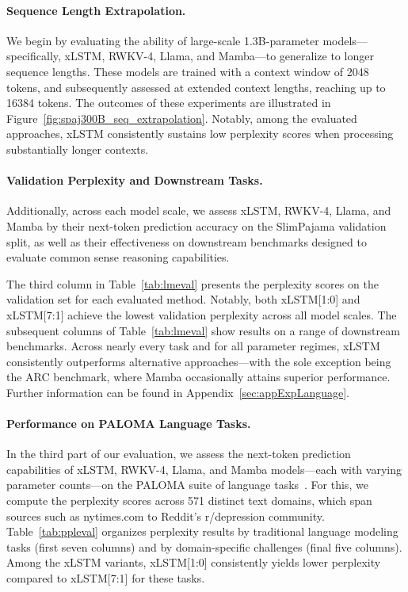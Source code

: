 \paragraph{Sequence Length Extrapolation.}
\label{sec:spaj300B_ctx_extrapolation}
We begin by evaluating the ability of large-scale 1.3B-parameter models—specifically, xLSTM, RWKV-4, Llama, and Mamba—to generalize to longer sequence lengths. These models are trained with a context window of 2048 tokens, and subsequently assessed at extended context lengths, reaching up to 16384 tokens. The outcomes of these experiments are illustrated in Figure~\ref{fig:spaj300B_seq_extrapolation}. Notably, among the evaluated approaches, xLSTM consistently sustains low perplexity scores when processing substantially longer contexts.

\paragraph{Validation Perplexity and Downstream Tasks.}
\label{sec:spaj_downstream_eval}
Additionally, across each model scale, we assess xLSTM, RWKV-4, Llama, and Mamba by their next-token prediction accuracy on the SlimPajama validation split, as well as their effectiveness on downstream benchmarks designed to evaluate common sense reasoning capabilities.

The third column in Table~\ref{tab:lmeval} presents the perplexity scores on the validation set for each evaluated method. Notably, both xLSTM[1:0] and xLSTM[7:1] achieve the lowest validation perplexity across all model scales. The subsequent columns of Table~\ref{tab:lmeval} show results on a range of downstream benchmarks. Across nearly every task and for all parameter regimes, xLSTM consistently outperforms alternative approaches—with the sole exception being the ARC benchmark, where Mamba occasionally attains superior performance. Further information can be found in Appendix~\ref{sec:appExpLanguage}.

\paragraph{Performance on PALOMA Language Tasks.} In the third part of our evaluation, we assess the next-token prediction capabilities of xLSTM, RWKV-4, Llama, and Mamba models—each with varying parameter counts—on the PALOMA suite of language tasks~\citep{Magnusson:23arxivshort}. For this, we compute the perplexity scores across 571 distinct text domains, which span sources such as nytimes.com to Reddit's r/depression community. Table~\ref{tab:ppleval} organizes perplexity results by traditional language modeling tasks (first seven columns) and by domain-specific challenges (final five columns). Among the xLSTM variants, xLSTM[1:0] consistently yields lower perplexity compared to xLSTM[7:1] for these tasks.

